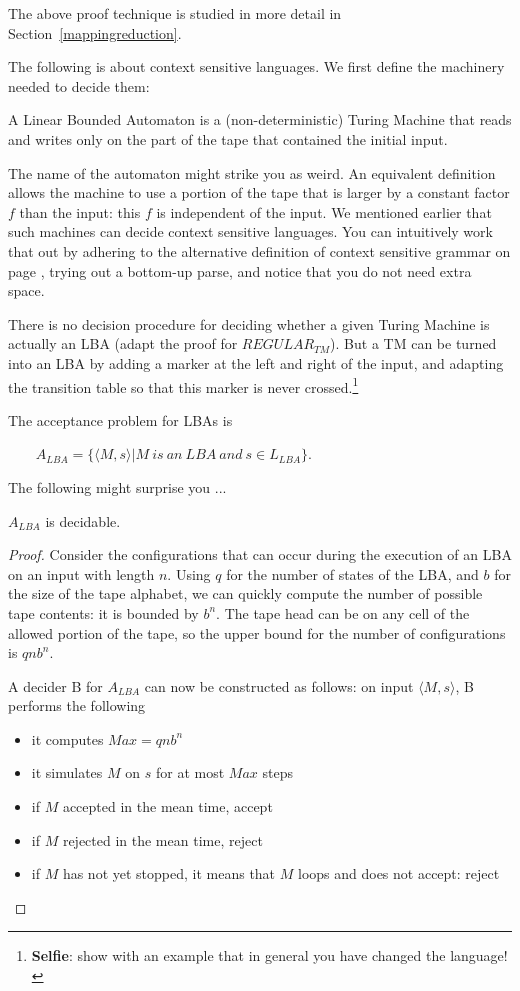 The above proof technique is studied in more detail in
Section~\ref{mappingreduction}.


The following is about context sensitive languages. We first define
the machinery needed to decide them:

\begin{definition}
A Linear Bounded Automaton is a (non-deterministic) Turing Machine
that reads and writes only on the part of the tape that contained the
initial input.
\end{definition}

The name of the automaton might strike you as weird. An equivalent
definition allows the machine to use a portion of the tape that is
larger by a constant factor $f$ than the input: this $f$ is
independent of the input. We mentioned earlier that such machines can
decide context sensitive languages. You can intuitively work that out
by adhering to the alternative definition of context sensitive grammar
on page \pageref{altdefcs}, trying out a bottom-up parse, and notice
that you do not need extra space.

There is no decision procedure for deciding whether a given Turing
Machine is actually an LBA (adapt the proof for $REGULAR_{TM}$). But a
TM can be turned into an LBA by adding a marker at the left and right
of the input, and adapting the transition table so that this marker is
never crossed.\footnote{{\bf Selfie}: show with an example that in
  general you have changed the language!}


The acceptance problem for LBAs is

$~~~~~~~~~A_{LBA} = \{\langle M,s \rangle | M~is~an~LBA~and~s \in L_{LBA}\}$.

The following might surprise you ...

\begin{theorem}
$A_{LBA}$ is decidable.
\end{theorem}
\begin{proof}
Consider the configurations that can occur during the execution of
an LBA on an input with length $n$. Using $q$ for the number of states
of the LBA, and $b$ for the size of the tape alphabet, we can quickly
compute the number of possible tape contents: it is bounded by
$b^n$. The tape head can be on any cell of the allowed portion of the
tape, so the upper bound for the number of configurations is $qnb^n$.

A decider B for $A_{LBA}$ can now be constructed as follows:
on input $\langle M,s \rangle$, B performs the following
\begin{itemize}
\item it computes $Max = qnb^n$
\item it simulates $M$ on $s$ for at most $Max$ steps
\item if $M$ accepted in the mean time, accept
\item if $M$ rejected in the mean time, reject
\item if $M$ has not yet stopped, it means that $M$ loops and does not
  accept: reject
\end{itemize}
\end{proof}

